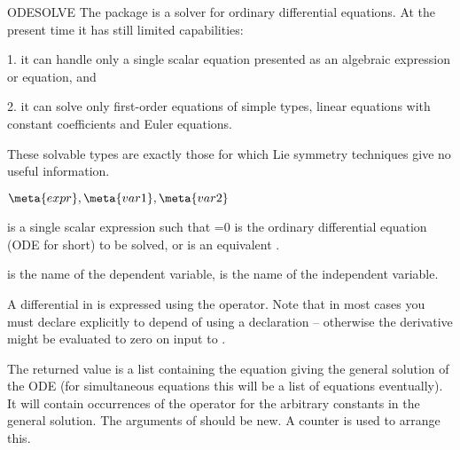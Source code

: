 \begin{Operator}{ODESOLVE}
The  package is a solver for ordinary differential
equations.  At the present time it has still limited capabilities:

  1. it  can handle  only a single  scalar equation  presented as  an
     algebraic expression or equation, and

  2. it can solve only first-order equations of simple  types, linear
     equations with constant coefficients and Euler equations.

These  solvable  types  are exactly  those  for  which  Lie  symmetry
techniques give no useful information.

\begin{Syntax}

\(\meta{expr},\meta{var1},\meta{var2}\)

\end{Syntax}

 is  a single  scalar expression  such  that =0  
is the ordinary differential equation (ODE for short) to be  solved, or
is an equivalent .

 is the name of the dependent variable,
 is the name of the independent variable.

A differential in  is expressed using the 
operator. Note that in most cases you must declare explicitly
 to depend of  using a 
declaration -- otherwise the derivative might be evaluated to
zero on input to .

The returned value is a  list containing the equation giving the  general
solution  of the  ODE  (for simultaneous  equations  this will  be  a
list  of equations  eventually).    It  will contain  occurrences  of
the  operator  for the  arbitrary constants  in the  general
solution.   The arguments of  should  be new.
A counter    is used  to  arrange  this.


\end{Operator}


